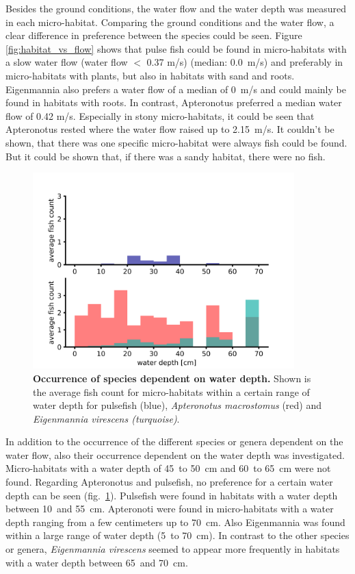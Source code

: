 Besides the ground conditions, the water flow and the water depth was measured in each micro-habitat. Comparing the ground conditions and the water flow, a clear difference in preference between the species could be seen. Figure \ref{fig:habitat_vs_flow} shows that pulse fish could be found in micro-habitats with a slow water flow (water flow $<$ 0.37 m/s) (median: 0.0~m/s) and preferably in micro-habitats with plants, but also in habitats with sand and roots. Eigenmannia also prefers a water flow of a median of 0~m/s and could mainly be found in habitats with roots. In contrast, Apteronotus preferred a median water flow of 0.42 m/s. Especially in stony micro-habitats, it could be seen that Apteronotus rested where the water flow raised up to 2.15~m/s. 
It couldn't be shown, that there was one specific micro-habitat were always fish could be found. But it could be shown that, if there was a sandy habitat, there were no fish.

\begin{figure}[H]
    \centering
    \includegraphics[width=0.9\textwidth]{pictures/Results/JULE_flow_depth2.png}
    \caption{\textbf{Occurrence of species dependent on water depth.} Shown is the average fish count for micro-habitats within a certain range of water depth for pulsefish (blue), \textit{Apteronotus macrostomus} (red) and \textit{Eigenmannia virescens (turquoise)}.}
    \label{fig:habitat_vs_depth}
\end{figure}

In addition to the occurrence of the different species or genera dependent on the water flow, also their occurrence dependent on the water depth was investigated. Micro-habitats with a water depth of 45~to 50~cm and 60~to 65~cm were not found. Regarding Apteronotus and pulsefish, no preference for a certain water depth can be seen (fig.~\ref{fig:habitat_vs_depth}). Pulsefish were found in habitats with a water depth between 10~and 55~cm. Apteronoti were found in micro-habitats with a water depth ranging from a few centimeters up to 70~cm. Also Eigenmannia was found within a large range of water depth (5~to 70~cm). In contrast to the other species or genera, \textit{Eigenmannia virescens} seemed to appear more frequently in habitats with a water depth between 65~and 70~cm.



